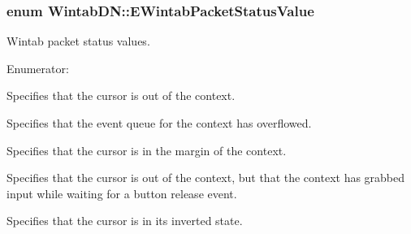 \hypertarget{namespace_wintab_d_n_afe14d17b83fb34685a298d857c203cac}{
\subsubsection[{EWintabPacketStatusValue}]{\setlength{\rightskip}{0pt plus 5cm}enum {\bf WintabDN::EWintabPacketStatusValue}}}
\label{namespace_wintab_d_n_afe14d17b83fb34685a298d857c203cac}


Wintab packet status values. 

\begin{Desc}
\item[Enumerator: ]\par
\begin{description}
\item[{\em 
\hypertarget{namespace_wintab_d_n_afe14d17b83fb34685a298d857c203cac}{
TPS\_\-PROXIMITY}
\label{namespace_wintab_d_n_afe14d17b83fb34685a298d857c203cac}
}]Specifies that the cursor is out of the context. \item[{\em 
\hypertarget{namespace_wintab_d_n_afe14d17b83fb34685a298d857c203cac}{
TPS\_\-QUEUE\_\-ERR}
\label{namespace_wintab_d_n_afe14d17b83fb34685a298d857c203cac}
}]Specifies that the event queue for the context has overflowed. \item[{\em 
\hypertarget{namespace_wintab_d_n_afe14d17b83fb34685a298d857c203cac}{
TPS\_\-MARGIN}
\label{namespace_wintab_d_n_afe14d17b83fb34685a298d857c203cac}
}]Specifies that the cursor is in the margin of the context. \item[{\em 
\hypertarget{namespace_wintab_d_n_afe14d17b83fb34685a298d857c203cac}{
TPS\_\-GRAB}
\label{namespace_wintab_d_n_afe14d17b83fb34685a298d857c203cac}
}]Specifies that the cursor is out of the context, but that the context has grabbed input while waiting for a button release event. \item[{\em 
\hypertarget{namespace_wintab_d_n_afe14d17b83fb34685a298d857c203cac}{
TPS\_\-INVERT}
\label{namespace_wintab_d_n_afe14d17b83fb34685a298d857c203cac}
}]Specifies that the cursor is in its inverted state. \end{description}
\end{Desc}

